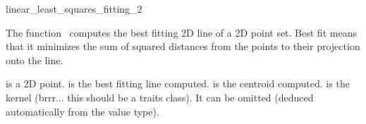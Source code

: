 
\begin{ccRefFunction}{linear_least_squares_fitting_2}  %

\ccDefinition
  
The function \ccRefName\ computes the best fitting 2D line of a 2D point set. Best
fit means that it minimizes the sum of squared distances from the points to
their projection onto the line.


  
  
  { is a 2D point. 
    is the best fitting line computed. 
    is the centroid computed.
    is the kernel (brrr... this should be a traits class).
   It can be omitted (deduced automatically from the value type).
     
  \ccSeeAlso
  }\\

\end{ccRefFunction}
